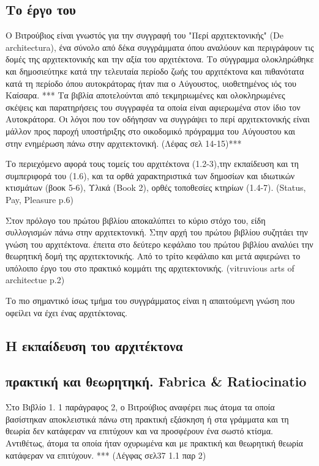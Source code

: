 \subsection{Το έργο του} 

Ο Βιτρούβιος είναι γνωστός για την συγγραφή του "Περί αρχιτεκτονικής" (De 
architectura), ένα σύνολο από δέκα συγγράμματα όπου αναλύουν και περιγράφουν 
τις δομές της αρχιτεκτονικής και την αξία του αρχιτέκτονα.
Το σύγγραμμα ολοκληρώθηκε και δημοσιεύτηκε κατά την τελευταία περίοδο ζωής του 
αρχιτέκτονα και πιθανότατα κατά τη περίοδο όπου αυτοκράτορας ήταν πια ο 
Αύγουστος, υιοθετημένος ιός του Καίσαρα. ***
Τα βιβλία αποτελούνται από τεκμηριωμένες και ολοκληρωμένες σκέψεις και 
παρατηρήσεις του συγγραφέα τα οποία είναι αφιερωμένα στον ίδιο τον Αυτοκράτορα. 
Οι λόγοι που τον οδήγησαν να συγγράψει το περί αρχιτεκτονικής είναι μάλλον προς 
παροχή υποστήριξης στο οικοδομικό πρόγραμμα του Αύγουστου και στην ενημέρωση 
πάνω στην αρχιτεκτονική. (Λέφας σελ 14-15)***

Το περιεχόμενο αφορά τους τομείς του αρχιτέκτονα (1.2-3),την εκπαίδευση και τη 
συμπεριφορά του (1.6), και τα ορθά χαρακτηριστικά των δημοσίων και ιδιωτικών 
κτισμάτων (βοοκ 5-6), Υλικά (Book 2), ορθές τοποθεσίες κτηρίων (1.4-7). 
(Status, Pay, Pleasure p.6)

Στον πρόλογο του πρώτου βιβλίου αποκαλύπτει το κύριο στόχο του, είδη 
συλλογισμών πάνω στην αρχιτεκτονική. Στην αρχή του πρώτου βιβλίου συζητάει την 
γνώση του αρχιτέκτονα. έπειτα στο δεύτερο κεφάλαιο του πρώτου βιβλίου αναλύει 
την θεωρητική δομή της αρχιτεκτονικής. Από το τρίτο κεφάλαιο και μετά αφιερώνει 
το υπόλοιπο έργο του στο πρακτικό κομμάτι της αρχιτεκτονικής. (vitruvious arts 
of architectue p.2)

Το πιο σημαντικό ίσως τμήμα του συγγράμματος είναι η απαιτούμενη γνώση που 
οφείλει να έχει ένας αρχιτέκτονας.

\subsection{Η εκπαίδευση του αρχιτέκτονα}

\subsection{πρακτική και θεωρητηκή. Fabrica \& Ratiocinatio}

Στο Βιβλίο 1. 1 παράγραφος 2, ο Βιτρούβιος αναφέρει πως άτομα τα οποία 
βασίστηκαν αποκλειστικά πάνω στη πρακτική εξάσκηση ή  στα γράμματα και τη 
θεωρία δεν κατάφεραν να επιτύχουν και να προσφέρουν ένα σωστό κτίσμα. 
Αντιθέτως, άτομα τα οποία ήταν οχυρωμένα και με πρακτική και θεωρητική θεωρία 
κατάφεραν να επιτύχουν. *** (Λέγφας σελ37 1.1 παρ 2)

